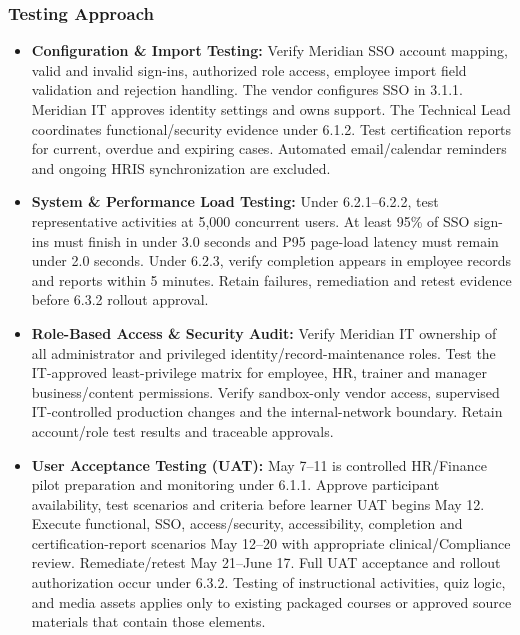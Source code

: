 \subsubsection{Testing Approach}\label{sec:testing-approach}
\begin{itemize}
\item \textbf{Configuration \& Import Testing:} Verify Meridian SSO account mapping, valid and invalid sign-ins, authorized role access, employee import field validation and rejection handling. The vendor configures SSO in 3.1.1. Meridian IT approves identity settings and owns support. The Technical Lead coordinates functional/\allowbreak{}security evidence under 6.1.2. Test certification reports for current, overdue and expiring cases. Automated email/\allowbreak{}calendar reminders and ongoing HRIS synchronization are excluded.
\item \textbf{System \& Performance Load Testing:} Under 6.2.1--6.2.2, test representative activities at 5,000 concurrent users. At least 95\% of SSO sign-ins must finish in under 3.0 seconds and P95 page-load latency must remain under 2.0 seconds. Under 6.2.3, verify completion appears in employee records and reports within 5 minutes. Retain failures, remediation and retest evidence before 6.3.2 rollout approval.
\item \textbf{Role-Based Access \& Security Audit:} Verify Meridian IT ownership of all administrator and privileged identity/\allowbreak{}record-maintenance roles. Test the IT-approved least-privilege matrix for employee, HR, trainer and manager business/\allowbreak{}content permissions. Verify sandbox-only vendor access, supervised IT-controlled production changes and the internal-network boundary. Retain account/\allowbreak{}role test results and traceable approvals.
\item \textbf{User Acceptance Testing (UAT):} May 7--11 is controlled HR/\allowbreak{}Finance pilot preparation and monitoring under 6.1.1. Approve participant availability, test scenarios and criteria before learner UAT begins May 12. Execute functional, SSO, access/\allowbreak{}security, accessibility, completion and certification-report scenarios May 12--20 with appropriate clinical/\allowbreak{}Compliance review. Remediate/\allowbreak{}retest May 21--June 17. Full UAT acceptance and rollout authorization occur under 6.3.2. Testing of instructional activities, quiz logic, and media assets applies only to existing packaged courses or approved source materials that contain those elements.
\end{itemize}



